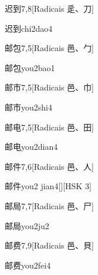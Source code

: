 \begin{entry}{迟到}{7,8}[Radicais ⾡、⼑]
  \begin{phonetics}{迟到}{chi2dao4}
  \end{phonetics}
\end{entry}

\begin{entry}{邮包}{7,5}[Radicais ⾢、⼓]
  \begin{phonetics}{邮包}{you2bao1}
  \end{phonetics}
\end{entry}

\begin{entry}{邮市}{7,5}[Radicais ⾢、⼱]
  \begin{phonetics}{邮市}{you2shi4}
  \end{phonetics}
\end{entry}

\begin{entry}{邮电}{7,5}[Radicais ⾢、⽥]
  \begin{phonetics}{邮电}{you2dian4}
  \end{phonetics}
\end{entry}

\begin{entry}{邮件}{7,6}[Radicais ⾢、⼈]
  \begin{phonetics}{邮件}{you2 jian4}[][HSK 3]
  \end{phonetics}
\end{entry}

\begin{entry}{邮局}{7,7}[Radicais ⾢、⼫]
  \begin{phonetics}{邮局}{you2ju2}
  \end{phonetics}
\end{entry}

\begin{entry}{邮费}{7,9}[Radicais ⾢、⾙]
  \begin{phonetics}{邮费}{you2fei4}
  \end{phonetics}
\end{entry}

